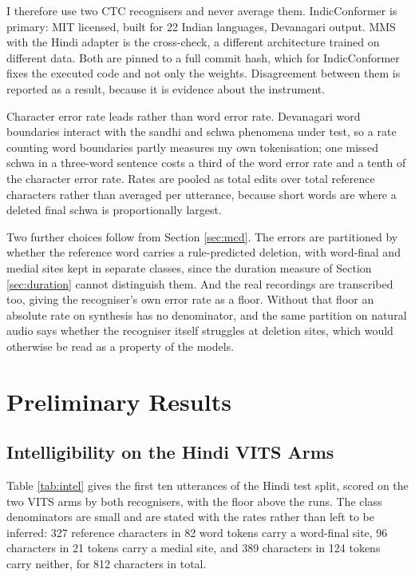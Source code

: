 \documentclass[runningheads]{llncs}
\begin{document}
I therefore use two CTC recognisers and never average them. IndicConformer
\cite{ai4bharat2025indicconformer} is primary: MIT licensed, built for 22
Indian languages, Devanagari output. MMS \cite{pratap2024mms} with the Hindi
adapter is the cross-check, a different architecture trained on different
data. Both are pinned to a full commit hash, which for IndicConformer fixes
the executed code and not only the weights. Disagreement between them is
reported as a result, because it is evidence about the instrument.

Character error rate leads rather than word error rate. Devanagari word
boundaries interact with the sandhi and schwa phenomena under test, so a rate
counting word boundaries partly measures my own tokenisation; one missed
schwa in a three-word sentence costs a third of the word error rate and a
tenth of the character error rate. Rates are pooled as total edits over total
reference characters rather than averaged per utterance, because short words
are where a deleted final schwa is proportionally largest.

Two further choices follow from Section \ref{sec:mcd}. The errors are
partitioned by whether the reference word carries a rule-predicted deletion,
with word-final and medial sites kept in separate classes, since the duration
measure of Section \ref{sec:duration} cannot distinguish them. And the real
recordings are transcribed too, giving the recogniser's own error rate as a
floor. Without that floor an absolute rate on synthesis has no denominator,
and the same partition on natural audio says whether the recogniser itself
struggles at deletion sites, which would otherwise be read as a property of
the models.

\section{Preliminary Results}

\subsection{Intelligibility on the Hindi VITS Arms}

Table \ref{tab:intel} gives the first ten utterances of the Hindi test split,
scored on the two VITS arms by both recognisers, with the floor above the runs.
The class denominators are small and are stated with the rates rather than left
to be inferred: 327 reference characters in 82 word tokens carry a word-final
site, 96 characters in 21 tokens carry a medial site, and 389 characters in 124
tokens carry neither, for 812 characters in total.
\end{document}
